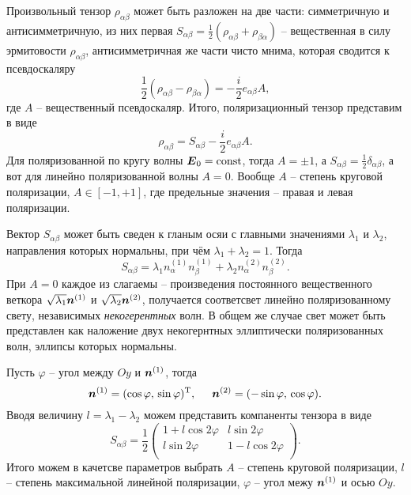 Произвольный тензор $\rho_{\alpha \beta}$ может быть разложен на две части: симметричную и антисимметричную, из них первая $S_{\alpha \beta} = \frac{1}{2} \left(\rho_{\alpha \beta} + \rho_{\beta \alpha}\right)$ -- вещественная в силу эрмитовости $\rho_{\alpha \beta}$, антисимметричная же части чисто мнима, которая сводится к псевдоскаляру
\begin{equation*}
    \frac{1}{2}\left(\rho_{\alpha\beta} - \rho_{\beta \alpha}\right) = - \frac{i}{2} e_{\alpha \beta} A,
\end{equation*}
где $A$ -- вещественный псевдоскаляр. Итого, поляризационный тензор представим в виде
\begin{equation*}
    \rho_{\alpha \beta} = S_{\alpha \beta} - \frac{i}{2} e_{\alpha \beta} A.
\end{equation*}
Для поляризованной по кругу волны $\mbox{\boldmath $E$}_0 = \text{const} $, тогда $A = \pm 1$, а $S_{\alpha \beta} = \frac{1}{2} \delta_{\alpha \beta}$, а вот для линейно поляризованной волны $A = 0$. Вообще $A$ -- степень круговой поляризации, $A \in [-1, + 1]$, где предельные значения -- правая и левая поляризации. 

Вектор $S_{\alpha \beta}$ может быть сведен к гланым осяи с главными значениями $\lambda_1$ и $\lambda_2$, направления которых нормальны, при чём $\lambda_1 + \lambda_2 = 1$. Тогда
\begin{equation*}
    S_{\alpha \beta} = \lambda_1 n_\alpha^{(1)} n_{\beta}^{(1)} + \lambda_2 n_\alpha^{(2)} n_\beta^{(2)}.
\end{equation*}
При $A = 0$ каждое из слагаемы -- произведения постоянного вещественного веткора $\sqrt{ \lambda_1} \mbox{\boldmath $n$}^{(1)}$ и $\sqrt{ \lambda_2} \mbox{\boldmath $n$}^{(2)}$, получается соответсвет линейно поляризованному свету, независимых \textit{некогерентных} волн. В общем же случае свет может быть представлен как наложение двух некогернтных эллиптически поляризованных волн, эллипсы которых нормальны. 


Пусть $\varphi$ -- угол между $Oy$ и $\mbox{\boldmath $n$}^{(1)}$, тогда
\begin{equation*}
    \mbox{\boldmath $n$}^{(1)} = (\cos \varphi,\, \sin \varphi)^{\text{T}}, \hspace{5 mm} 
    \mbox{\boldmath $n$}^{(2)} = (-\sin \varphi,\,  \cos \varphi).
\end{equation*}
Вводя величину $l = \lambda_1 - \lambda_2$ можем представить компаненты тензора в виде
\begin{equation*}
    S_{\alpha \beta} = \frac{1}{2} \begin{pmatrix}
        1 + l \cos 2 \varphi & l \sin 2 \varphi  \\
        l \sin 2 \varphi & 1 - l \cos 2 \varphi  \\
    \end{pmatrix}.
\end{equation*}
Итого можем в качетсве параметров выбрать $A$ -- степень круговой поляризации, $l$ -- степень максимальной линейной поляризации, $\varphi$ -- угол межу $\mbox{\boldmath $n$}^{(1)}$ и осью $Oy$. 


